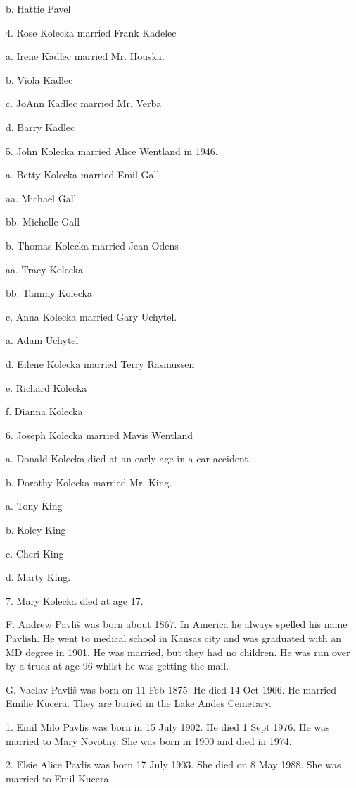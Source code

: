 \documentclass[a4paper]{article}
\begin{document}
b. Hattie Pavel

4. Rose Kolecka married Frank Kadelec

a. Irene Kadlec married Mr. Houska.

b. Viola Kadlec

c. JoAnn Kadlec married Mr. Verba

d. Barry Kadlec

5. John Kolecka married Alice Wentland in 1946.  

a. Betty Kolecka married Emil Gall

aa. Michael Gall

bb. Michelle Gall

b. Thomas Kolecka married Jean Odens

aa. Tracy Kolecka

bb. Tammy Kolecka

c. Anna Kolecka married Gary Uchytel.

a. Adam Uchytel

d. Eilene Kolecka married Terry Rasmussen

e. Richard Kolecka

f. Dianna Kolecka

6. Joseph Kolecka married Mavis Wentland

a. Donald Kolecka died  at an early age in a car accident.

b. Dorothy Kolecka married Mr. King.

a. Tony King

b. Koley King

c. Cheri King

d. Marty King.  

7. Mary Kolecka died at age 17.

F. Andrew Pavli\v{s} was born about 1867. In America he always spelled his name Pavlish.  He went to medical school in Kansas city and was graduated with an MD degree in 1901.  He was married, but they had no children.  He was run over by a truck at age 96 whilst he was getting the mail.

G. Vaclav Pavli\v{s} was born on 11 Feb 1875.  He died 14 Oct 1966.  He married Emilie Kucera.  They are buried in the Lake Andes Cemetary.    

1. Emil Milo Pavlis was born in 15 July 1902.  He died  1 Sept 1976.  He was married to Mary Novotny. She was born in 1900 and died in 1974.

2. Elsie Alice Pavlis was born 17 July 1903.  She died on 8 May 1988.  She was married to Emil Kucera.
\end{document}
